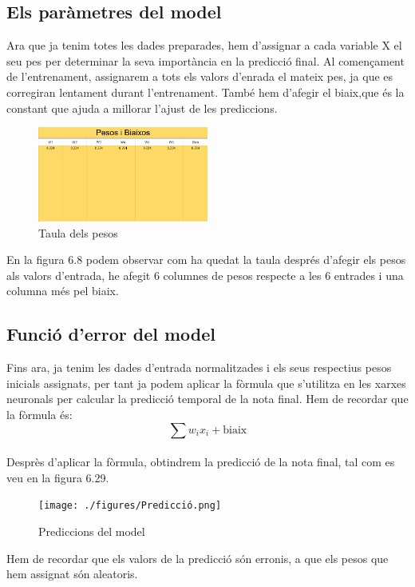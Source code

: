 \subsection{Els paràmetres del model}
Ara que ja tenim totes les dades preparades, hem d'assignar a cada variable X el seu pes per determinar la seva importància en la predicció final. Al començament de l'entrenament, assignarem a tots els valors d'enrada el mateix pes, ja que es corregiran lentament durant l'entrenament.
També hem d'afegir el biaix,que és la constant que ajuda a millorar l'ajust de les prediccions.

\begin{figure}[H]
    \centering
    \includegraphics[width=0.5\textwidth]{./figures/Pesos.png}
    \caption{Taula dels pesos}
\end{figure}

En la figura 6.8 podem observar com ha quedat la taula després d'afegir els pesos als valors d'entrada, he afegit 6 columnes de pesos respecte a les 6 entrades i una columna més pel biaix.

\subsection{Funció d'error del model}
Fins ara, ja tenim les dades d'entrada normalitzades i els seus respectius pesos inicials assignats, per tant ja podem aplicar la fòrmula que s'utilitza en les xarxes neuronals per calcular la predicció temporal de la nota final. Hem de recordar que la fòrmula és:\\
\[
\sum w_i x_i + \text{biaix}
\] \\
Desprès d'aplicar la fòrmula, obtindrem la predicció de la nota final, tal com es veu en la figura 6.29.

\begin{figure}[H]
    \centering
    \texttt{[image: ./figures/Predicció.png]}
    \caption{Prediccions del model}
 \end{figure}

Hem de recordar que els valors de la predicció són erronis, a que els pesos que hem assignat són aleatoris.


